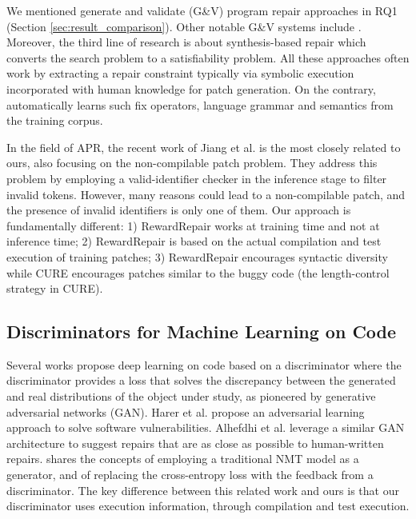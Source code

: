 We mentioned generate and validate (G\&V) program repair approaches in RQ1 (Section \ref{sec:result_comparison}). Other notable G\&V systems include \cite{jaid,Yuan2017ARJAAR,astor,ali-issta19-bytecode}.
Moreover, the third line of research is about synthesis-based repair \cite{acs,nopol,Angelixicse16,s3,directfix,CrashProgramRepair-ISSTA19,concolic-repair-PLDI21}
which converts the search problem to a satisfiability problem.
All these approaches often work by extracting a repair constraint typically via symbolic execution incorporated with human knowledge for patch generation.
On the contrary, \approach automatically learns such fix operators,  language grammar and semantics from the training corpus.

In the field of APR, the recent work of Jiang et al. \cite{CURE-icse21} is the most closely related to ours, also focusing on the  non-compilable patch problem. They address this problem by employing a valid-identifier checker in the inference stage to filter invalid tokens.
However, many reasons could lead to a non-compilable patch, and the presence of invalid identifiers is only one of them. 
Our approach is fundamentally different: 1) RewardRepair works at training time and not at inference time; 2) RewardRepair is based on the actual compilation and test execution of training patches; 3) RewardRepair encourages syntactic diversity while CURE encourages patches similar to the buggy code (the length-control strategy in CURE).

\subsection{Discriminators for Machine Learning on Code}

Several works propose deep learning on code based on a discriminator \cite{Harer-GAN-NIPS18, adversarial-repair-gan} where the discriminator provides a loss that solves the discrepancy between the generated and real distributions of the object under study, as pioneered by generative adversarial networks (GAN)\cite{GanGoodFellow}.  
Harer et al. \cite{Harer-GAN-NIPS18} propose an adversarial learning approach to solve software vulnerabilities. 
Alhefdhi et al. \cite{adversarial-repair-gan} leverage a similar GAN architecture to suggest repairs that are as close as possible to human-written repairs. 
\approach shares the concepts of employing a traditional NMT model as a generator, and of replacing the cross-entropy loss with the feedback from a discriminator.  
The key difference between this related work and ours is that our discriminator uses execution information, through compilation and test execution. 

